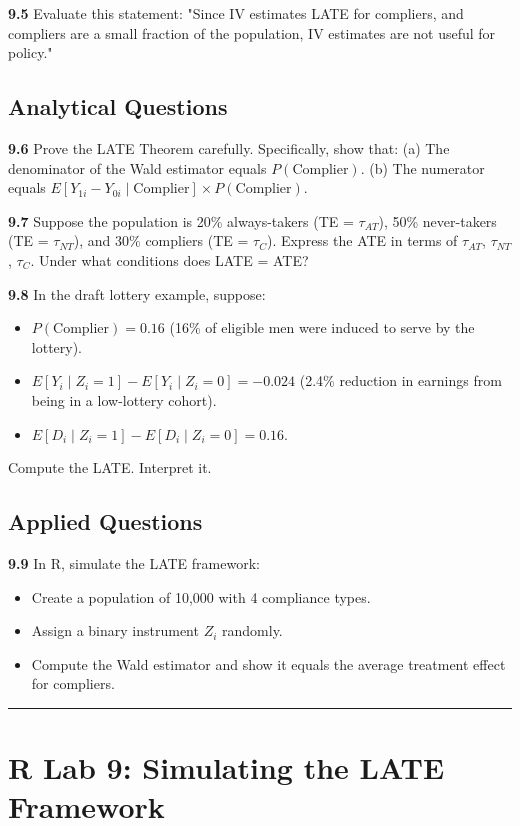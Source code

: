 \textbf{9.5} Evaluate this statement: "Since IV estimates LATE for compliers, and compliers are a small fraction of the population, IV estimates are not useful for policy."

\subsection{Analytical Questions}

\textbf{9.6} Prove the LATE Theorem carefully. Specifically, show that:
(a) The denominator of the Wald estimator equals $P(\text{Complier})$.
(b) The numerator equals $E[Y_{1i} - Y_{0i} \mid \text{Complier}] \times P(\text{Complier})$.

\textbf{9.7} Suppose the population is 20\% always-takers (TE = $\tau_{AT}$), 50\% never-takers (TE = $\tau_{NT}$), and 30\% compliers (TE = $\tau_C$). Express the ATE in terms of $\tau_{AT}$, $\tau_{NT}$, $\tau_C$. Under what conditions does LATE = ATE?

\textbf{9.8} In the draft lottery example, suppose:
\begin{itemize}
\item $P(\text{Complier}) = 0.16$ (16\% of eligible men were induced to serve by the lottery).
\item $E[Y_i \mid Z_i = 1] - E[Y_i \mid Z_i = 0] = -0.024$ (2.4\% reduction in earnings from being in a low-lottery cohort).
\item $E[D_i \mid Z_i = 1] - E[D_i \mid Z_i = 0] = 0.16$.
\end{itemize}

Compute the LATE. Interpret it.

\subsection{Applied Questions}

\textbf{9.9} In R, simulate the LATE framework:
\begin{itemize}
\item Create a population of 10,000 with 4 compliance types.
\item Assign a binary instrument $Z_i$ randomly.
\item Compute the Wald estimator and show it equals the average treatment effect for compliers.
\end{itemize}

\medskip\hrule\medskip

\section{R Lab 9: Simulating the LATE Framework}

